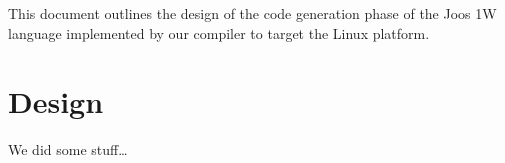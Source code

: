 \documentclass[pdftex,11pt,a4paper]{article}
\begin{document}

This document outlines the design of the code generation phase of
the Joos 1W language implemented by our compiler to target the
 Linux platform.


\section{Design}

We did some stuff\ldots
\end{document}
